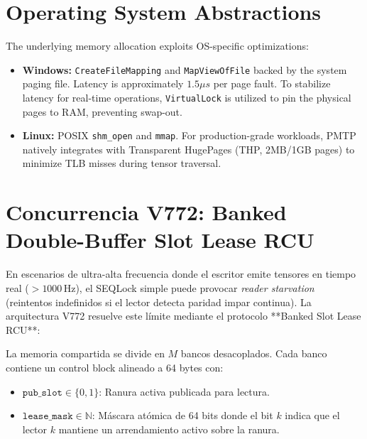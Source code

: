 \section{Operating System Abstractions}

The underlying memory allocation exploits OS-specific optimizations:
\begin{itemize}
    \item \textbf{Windows:} \texttt{CreateFileMapping} and \texttt{MapViewOfFile} backed by the system paging file. Latency is approximately $1.5\mu s$ per page fault. To stabilize latency for real-time operations, \texttt{VirtualLock} is utilized to pin the physical pages to RAM, preventing swap-out.
    \item \textbf{Linux:} POSIX \texttt{shm\_open} and \texttt{mmap}. For production-grade workloads, PMTP natively integrates with Transparent HugePages (THP, 2MB/1GB pages) to minimize TLB misses during tensor traversal.
\end{itemize}

\section{Concurrencia V772: Banked Double-Buffer Slot Lease RCU}
\label{sec:pmtp_slot_lease_rcu}

En escenarios de ultra-alta frecuencia donde el escritor emite tensores en tiempo real ($> 1000\,\text{Hz}$), el SEQLock simple puede provocar \emph{reader starvation} (reintentos indefinidos si el lector detecta paridad impar continua). La arquitectura V772 resuelve este límite mediante el protocolo **Banked Slot Lease RCU**:

\begin{definition}
La memoria compartida se divide en $M$ bancos desacoplados. Cada banco contiene un control block alineado a 64 bytes con:
\begin{itemize}
    \item $\texttt{pub\_slot} \in \{0, 1\}$: Ranura activa publicada para lectura.
    \item $\texttt{lease\_mask} \in \mathbb{N}$: Máscara atómica de 64 bits donde el bit $k$ indica que el lector $k$ mantiene un arrendamiento activo sobre la ranura.
\end{itemize}
\end{definition}

